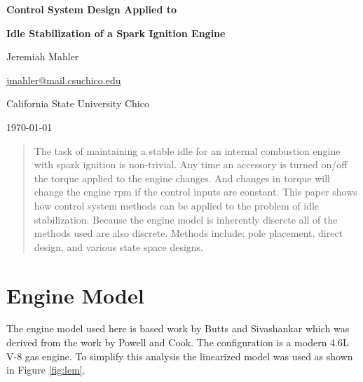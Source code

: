 \documentclass{article}
\begin{document}

\thispagestyle{empty}

\vspace*{1.0in}
\centerline{\Large \textbf{Control System Design Applied to}}
\centerline{\Large \textbf{Idle Stabilization of a Spark Ignition Engine}}
\vspace{0.1in}
\centerline{\normalsize {Jeremiah Mahler}}
\centerline{\small {\href{mailto:jmahler@mail.csuchico.edu}{jmahler@mail.csuchico.edu}} }
\vspace{0.1in}
\centerline{\normalsize {California State University Chico}}
\centerline{\small \today}
\vspace{0.5in}

\vfill

\begin{abstract}
\noindent
The task of maintaining a stable idle for an internal combustion
engine with spark ignition is non-trivial.
Any time an accessory is turned on/off the torque applied to
the engine changes.
And changes in torque will change the engine rpm if the control
inputs are constant.
This paper shows how control system methods can be applied to
the problem of idle stabilization.
Because the engine model is inherently discrete all of the methods
used are also discrete.
Methods include: pole placement, direct design, and
various state space designs.
\end{abstract}

\vspace{1.5in}



\clearpage
\tableofcontents

\clearpage
\section{Engine Model}

The engine model used here is based work
by Butts and Sivashankar\autocite{532315} which was derived from
the work by Powell and Cook\autocite{4789342}.
The configuration is a modern 4.6L V-8 gas engine.
To simplify this analysis the linearized model was used as shown in
Figure \ref{fig:lem}.
\end{document}
